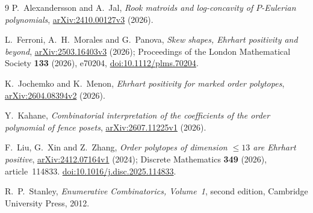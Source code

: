 \documentclass[11pt]{article}
\theoremstyle{definition}
\theoremstyle{remark}
\begin{document}
\begin{thebibliography}{9}
P.~Alexandersson and A.~Jal, \emph{Rook matroids and log-concavity of
$P$-Eulerian polynomials},
\href{https://arxiv.org/abs/2410.00127v3}{arXiv:2410.00127v3} (2026).

L.~Ferroni, A.~H.~Morales and G.~Panova, \emph{Skew shapes, Ehrhart
positivity and beyond},
\href{https://arxiv.org/abs/2503.16403v3}{arXiv:2503.16403v3} (2026);
Proceedings of the London Mathematical Society \textbf{133} (2026),
e70204, \href{https://doi.org/10.1112/plms.70204}{doi:10.1112/plms.70204}.

K.~Jochemko and K.~Menon, \emph{Ehrhart positivity for marked order
polytopes}, \href{https://arxiv.org/abs/2604.08394v2}{arXiv:2604.08394v2}
(2026).

Y.~Kahane, \emph{Combinatorial interpretation of the coefficients of the
order polynomial of fence posets},
\href{https://arxiv.org/abs/2607.11225v1}{arXiv:2607.11225v1} (2026).

F.~Liu, G.~Xin and Z.~Zhang, \emph{Order polytopes of dimension $\le13$
are Ehrhart positive},
\href{https://arxiv.org/abs/2412.07164v1}{arXiv:2412.07164v1} (2024);
Discrete Mathematics \textbf{349} (2026), article~114833.
\href{https://doi.org/10.1016/j.disc.2025.114833}{doi:10.1016/j.disc.2025.114833}.

R.~P.~Stanley, \emph{Enumerative Combinatorics, Volume~1}, second
edition, Cambridge University Press, 2012.
\end{thebibliography}
\end{document}
